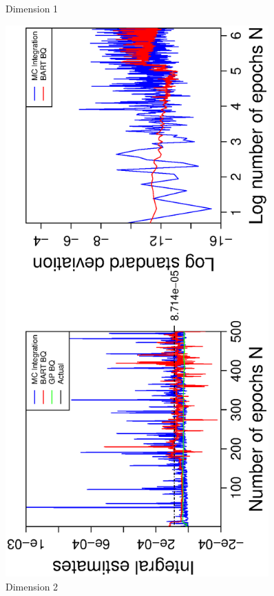 \begin{figure}[H]
\begin{minipage}[b]{0.4\textwidth}
     \vspace{-1cm}
     \caption{Dimension 1}
  \end{minipage}
    \hspace{1.5cm}
  \begin{minipage}[b]{0.4\textwidth}
    \includegraphics[width= 0.9\textwidth, angle = -90]{report/Figures/2/convergenceMean22Dimensions.eps}
    \vspace{-1cm}
    \caption{Dimension 2}
  \end{minipage}
\end{figure}
\vspace{-1cm}

